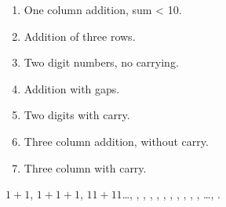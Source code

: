 \begin{slide*}
\medskip

\begin{enumerate}
\item One column addition, sum < 10.
\item Addition of three rows.
\item Two digit numbers, no carrying.
\item Addition with gaps.
\item Two digits with carry.
\item Three column addition, without carry.
\item Three column with carry.
\end{enumerate}

\noindent $1+1$, $1+1+1$, $11+11$\ldots {}, , ,
, , ,
, , , ,
, \ldots {}, .

\end{slide*}
